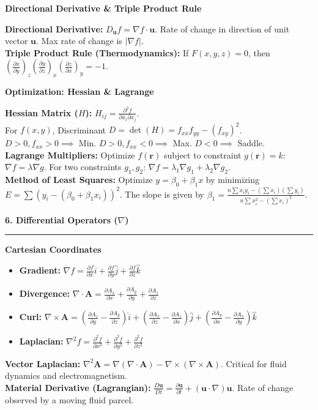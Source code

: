 \documentclass[10pt, landscape, twocolumn]{article}
\newcommand{\cheatsheetsection}[1]{
    \vspace{0.8em}
    {\color{themeblue}\large\bfseries #1} \par
    \vspace{-0.4em}
    {\color{themeblue}\rule{\linewidth}{1pt}} \par
    \vspace{0.3em}
}
\newcommand{\cheatsheetsubsection}[1]{
    \vspace{0.5em}
    {\color{themeblue}\normalsize\bfseries #1} \par
    \vspace{0.2em}
}
\begin{document}
\cheatsheetsubsection{Directional Derivative \& Triple Product Rule}
\textbf{Directional Derivative:} $D_{\mathbf{u}}f = \nabla f \cdot \mathbf{u}$. Rate of change in direction of unit vector $\mathbf{u}$. Max rate of change is $|\nabla f|$. \\
\textbf{Triple Product Rule (Thermodynamics):} If $F(x,y,z)=0$, then $\left(\frac{\partial x}{\partial y}\right)_z \left(\frac{\partial y}{\partial z}\right)_x \left(\frac{\partial z}{\partial x}\right)_y = -1$.

\cheatsheetsubsection{Optimization: Hessian \& Lagrange}
\textbf{Hessian Matrix ($H$):} $H_{ij} = \frac{\partial^2 f}{\partial x_i \partial x_j}$. \\
For $f(x,y)$, Discriminant $D = \det(H) = f_{xx}f_{yy} - (f_{xy})^2$. \\
$D>0, f_{xx}>0 \implies$ Min. \quad $D>0, f_{xx}<0 \implies$ Max. \quad $D<0 \implies$ Saddle. \\
\textbf{Lagrange Multipliers:} Optimize $f(\mathbf{r})$ subject to constraint $g(\mathbf{r})=k$: $\nabla f = \lambda \nabla g$. For two constraints $g_1, g_2$: $\nabla f = \lambda_1 \nabla g_1 + \lambda_2 \nabla g_2$. \\
\textbf{Method of Least Squares:} Optimize $y = \beta_0 + \beta_1 x$ by minimizing $E = \sum (y_i - (\beta_0 + \beta_1 x_i))^2$. The slope is given by $\beta_1 = \frac{n\sum x_iy_i - (\sum x_i)(\sum y_i)}{n\sum x_i^2 - (\sum x_i)^2}$.

\cheatsheetsection{6. Differential Operators ($\nabla$)}

\cheatsheetsubsection{Cartesian Coordinates}
\begin{itemize}[leftmargin=*, nosep]
    \item \textbf{Gradient:} $\nabla f = \frac{\partial f}{\partial x}\hat{i} + \frac{\partial f}{\partial y}\hat{j} + \frac{\partial f}{\partial z}\hat{k}$
    \item \textbf{Divergence:} $\nabla \cdot \mathbf{A} = \frac{\partial A_x}{\partial x} + \frac{\partial A_y}{\partial y} + \frac{\partial A_z}{\partial z}$
    \item \textbf{Curl:} $\nabla \times \mathbf{A} = \left(\frac{\partial A_z}{\partial y} - \frac{\partial A_y}{\partial z}\right)\hat{i} + \left(\frac{\partial A_x}{\partial z} - \frac{\partial A_z}{\partial x}\right)\hat{j} + \left(\frac{\partial A_y}{\partial x} - \frac{\partial A_x}{\partial y}\right)\hat{k}$
    \item \textbf{Laplacian:} $\nabla^2 f = \frac{\partial^2 f}{\partial x^2} + \frac{\partial^2 f}{\partial y^2} + \frac{\partial^2 f}{\partial z^2}$
\end{itemize}
\vspace{0.3em}
\textbf{Vector Laplacian:} $\nabla^2 \mathbf{A} = \nabla(\nabla \cdot \mathbf{A}) - \nabla \times (\nabla \times \mathbf{A})$. Critical for fluid dynamics and electromagnetism.\\
\textbf{Material Derivative (Lagrangian):} $\frac{D\mathbf{u}}{Dt} = \frac{\partial \mathbf{u}}{\partial t} + (\mathbf{u} \cdot \nabla)\mathbf{u}$. Rate of change observed by a moving fluid parcel.
\end{document}
